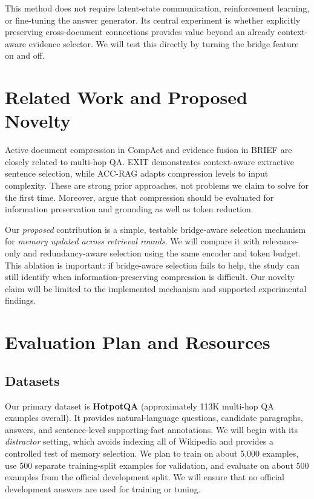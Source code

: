\documentclass[11pt]{article}
\begin{document}
This method does not require latent-state communication, reinforcement learning, or fine-tuning the answer generator. Its central experiment is whether explicitly preserving cross-document connections provides value beyond an already context-aware evidence selector. We will test this directly by turning the bridge feature on and off.

\section{Related Work and Proposed Novelty}

Active document compression in CompAct \citep{yoon-etal-2024-compact} and evidence fusion in BRIEF \citep{li-etal-2025-brief} are closely related to multi-hop QA. EXIT \citep{hwang-etal-2025-exit} demonstrates context-aware extractive sentence selection, while ACC-RAG \citep{guo-etal-2025-enhancing} adapts compression levels to input complexity. These are strong prior approaches, not problems we claim to solve for the first time. Moreover, \citet{lajewska-etal-2025-understanding} argue that compression should be evaluated for information preservation and grounding as well as token reduction.

Our \emph{proposed} contribution is a simple, testable bridge-aware selection mechanism for \emph{memory updated across retrieval rounds}. We will compare it with relevance-only and redundancy-aware selection using the same encoder and token budget. This ablation is important: if bridge-aware selection fails to help, the study can still identify when information-preserving compression is difficult. Our novelty claim will be limited to the implemented mechanism and supported experimental findings.

\section{Evaluation Plan and Resources}

\subsection{Datasets}

Our primary dataset is \textbf{HotpotQA} (approximately 113K multi-hop QA examples overall). It provides natural-language questions, candidate paragraphs, answers, and sentence-level supporting-fact annotations. We will begin with its \emph{distractor} setting, which avoids indexing all of Wikipedia and provides a controlled test of memory selection. We plan to train on about 5,000 examples, use 500 separate training-split examples for validation, and evaluate on about 500 examples from the official development split. We will ensure that no official development answers are used for training or tuning.
\end{document}
